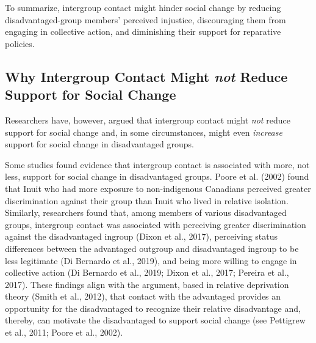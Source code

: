 \documentclass[12pt, letterpaper]{article}
\begin{document}
To summarize, intergroup contact might hinder social change by reducing
disadvantaged-group members' perceived injustice, discouraging them from
engaging in collective action, and diminishing their support for
reparative policies.

\hypertarget{why-intergroup-contact-might-not-reduce-support-for-social-change}{%
\subsection{\texorpdfstring{Why Intergroup Contact Might \emph{not}
Reduce Support for Social
Change}{Why Intergroup Contact Might not Reduce Support for Social Change}}\label{why-intergroup-contact-might-not-reduce-support-for-social-change}}

Researchers have, however, argued that intergroup contact might
\emph{not} reduce support for social change and, in some circumstances,
might even \emph{increase} support for social change in disadvantaged
groups.

Some studies found evidence that intergroup contact is associated with
more, not less, support for social change in disadvantaged groups. Poore
et al. (2002) found that Inuit who had more exposure to non-indigenous
Canadians perceived greater discrimination against their group than
Inuit who lived in relative isolation. Similarly, researchers found
that, among members of various disadvantaged groups, intergroup contact
was associated with perceiving greater discrimination against the
disadvantaged ingroup (Dixon et al., 2017), perceiving status
differences between the advantaged outgroup and disadvantaged ingroup to
be less legitimate (Di Bernardo et al., 2019), and being more willing to
engage in collective action (Di Bernardo et al., 2019; Dixon et al.,
2017; Pereira et al., 2017). These findings align with the argument,
based in relative deprivation theory (Smith et al., 2012), that contact
with the advantaged provides an opportunity for the disadvantaged to
recognize their relative disadvantage and, thereby, can motivate the
disadvantaged to support social change (see Pettigrew et al., 2011;
Poore et al., 2002).
\end{document}

